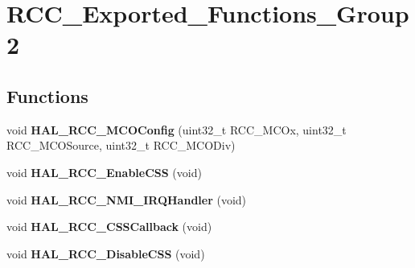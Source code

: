 \hypertarget{group___r_c_c___exported___functions___group2}{}\section{R\+C\+C\+\_\+\+Exported\+\_\+\+Functions\+\_\+\+Group2}
\label{group___r_c_c___exported___functions___group2}
\subsection*{Functions}
\begin{DoxyCompactItemize}
\item 
\mbox{\label{group___r_c_c___exported___functions___group2_ga9de46b9c4ecdb1a5e34136b051a6132c}} 
void {\bfseries H\+A\+L\+\_\+\+R\+C\+C\+\_\+\+M\+C\+O\+Config} (uint32\+\_\+t R\+C\+C\+\_\+\+M\+C\+Ox, uint32\+\_\+t R\+C\+C\+\_\+\+M\+C\+O\+Source, uint32\+\_\+t R\+C\+C\+\_\+\+M\+C\+O\+Div)
\item 
\mbox{\label{group___r_c_c___exported___functions___group2_gaa0f440ce71c18e95b12b2044cc044bea}} 
void {\bfseries H\+A\+L\+\_\+\+R\+C\+C\+\_\+\+Enable\+C\+SS} (void)
\item 
\mbox{\label{group___r_c_c___exported___functions___group2_ga0c124cf403362750513cae7fb6e6b195}} 
void {\bfseries H\+A\+L\+\_\+\+R\+C\+C\+\_\+\+N\+M\+I\+\_\+\+I\+R\+Q\+Handler} (void)
\item 
\mbox{\label{group___r_c_c___exported___functions___group2_gaa05b9157de5a48617bd06eb6aafa68aa}} 
void {\bfseries H\+A\+L\+\_\+\+R\+C\+C\+\_\+\+C\+S\+S\+Callback} (void)
\item 
\mbox{\label{group___r_c_c___exported___functions___group2_gac2f9cf8f56fd7b22c62ddf32aa5ee3fb}} 
void {\bfseries H\+A\+L\+\_\+\+R\+C\+C\+\_\+\+Disable\+C\+SS} (void)
\item 
\mbox{\label{group___r_c_c___exported___functions___group2_ga887cafe88b21a059061b077a1e3fa7d8}} 

\end{DoxyCompactItemize}
